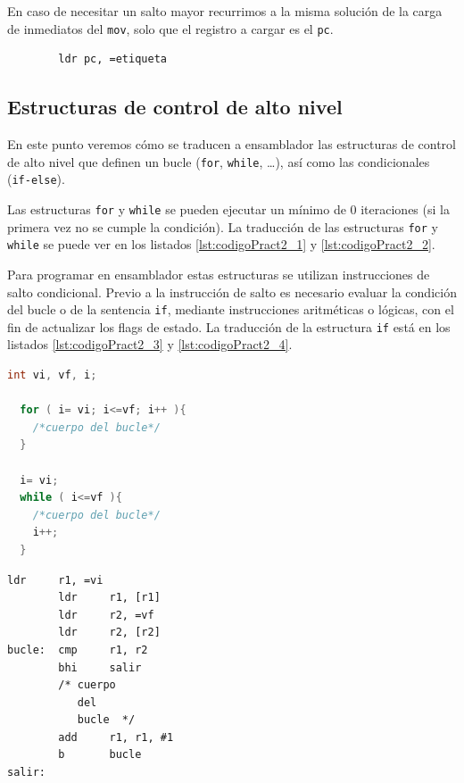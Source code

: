 En caso de necesitar un salto mayor recurrimos
a la misma solución de la carga de inmediatos del {\tt mov}, solo que el
registro a cargar es el {\tt pc}.

\begin{lstlisting}
        ldr pc, =etiqueta
\end{lstlisting}

\subsection{Estructuras de control de alto nivel}

En este punto veremos cómo se traducen a ensamblador las estructuras
de control de alto nivel que definen un bucle ({\tt for}, {\tt while},
\dots), así como las condicionales ({\tt if-else}).

Las estructuras {\tt for} y {\tt while} se pueden ejecutar un mínimo de 0
iteraciones (si la primera vez no se cumple la condición). La traducción de
las estructuras {\tt for} y {\tt while} se puede ver en los listados
\ref{lst:codigoPract2_1} y \ref{lst:codigoPract2_2}.

Para programar en ensamblador estas estructuras se utilizan instrucciones
de salto condicional. Previo a la instrucción de salto es necesario evaluar
la condición del bucle o de la sentencia {\tt if}, mediante instrucciones
aritméticas o lógicas, con el fin de actualizar los flags de estado. La
traducción de la estructura {\tt if} está en los listados
\ref{lst:codigoPract2_3} y \ref{lst:codigoPract2_4}.

\begin{lstlisting}[caption={Estructura del for y while en C (tipos1.c)},label={lst:codigoPract2_1},language=C]
  int vi, vf, i;

  for ( i= vi; i<=vf; i++ ){ 
    /*cuerpo del bucle*/
  }

  i= vi; 
  while ( i<=vf ){ 
    /*cuerpo del bucle*/
    i++; 
  }
\end{lstlisting}

\begin{lstlisting}[caption={Traducción de las estructuras {\tt for} y {\tt while}.
Hemos supuesto que el valor inicial está en la variable {\tt vi}
y el valor final en  la variable {\tt vf} y se ha utilizado el
registro {\tt r1} como índice de las iteraciones {\tt i}.},label={lst:codigoPract2_2}]
        ldr     r1, =vi
        ldr     r1, [r1]
        ldr     r2, =vf
        ldr     r2, [r2]
bucle:  cmp     r1, r2
        bhi     salir
        /* cuerpo
           del
           bucle  */
        add     r1, r1, #1
        b       bucle
salir:
\end{lstlisting}

